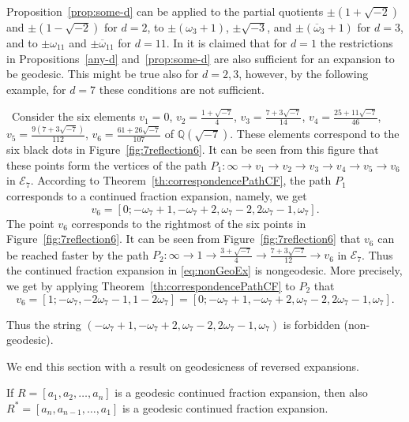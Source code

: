\documentclass[graybox]{svmult}
\begin{document}
Proposition~\ref{prop:some-d} can be applied to the partial quotients $\pm(1 + \sqrt{-2})$ and $\pm(1 - \sqrt{-2})$ for $d=2$,  to $\pm(\omega_{3}+1)$, $\pm \sqrt{-3}$, and $\pm( \overline{\omega}_{3} + 1)$ for 
$d=3$, and to $\pm \omega_{11}$ and $\pm\overline{\omega}_{11}$ for $d =11$.  
In \cite{H-2} it is claimed that for $d=1$ the restrictions in Propositions~\ref{any-d} and~\ref{prop:some-d} are also sufficient for an expansion to be geodesic.  This might be true also for $d= 2, 3$, however, by the following example, for $d=7$ these conditions are not sufficient.
\begin{example}[A subtle nongeodesic path for the case $d=7$]\label{ex:exd7}
\, Consider the six elements $v_1=0$, $v_2=\frac{1 +  \sqrt{-7}}4 $, $v_3=\frac{7 + 3 \sqrt{-7}}{14} $, $v_4=\frac{25 + 11 \sqrt{-7}}{46} $, $v_5=\frac{9(7 + 3 \sqrt{-7})}{112}$, $v_6=\frac{61 + 26 \sqrt{-7}}{107}$ of $\mathbb{Q}(\sqrt{-7})$. These elements correspond to the six black dots in Figure~\ref{fig:7reflection6}. It can be seen from this figure that these points form the vertices of the path $P_1: \infty\to v_1\to v_2\to v_3\to v_4\to v_5\to v_6$ in $\mathcal{E}_7$. According to Theorem~\ref{th:correspondencePathCF}, the path $P_1$ corresponds to a continued fraction expansion, namely, we get
\begin{equation}\label{eq:nonGeoEx}
v_6 = [0;-\omega_7+1,-\omega_7+2, \omega_7-2,2\omega_7-1,\omega_7].
\end{equation}
The point $v_6$ corresponds to the rightmost of the six points in Figure~\ref{fig:7reflection6}. It can be seen from Figure~\ref{fig:7reflection6} that $v_6$ can be reached faster by the path  $P_2:\infty\to 1\to \frac{3 + \sqrt{-7}}4\to \frac{7 + 3 \sqrt{-7}}{12}\to v_6$ in $\mathcal{E}_7$. Thus the continued fraction expansion in \eqref{eq:nonGeoEx} is nongeodesic. More precisely, we get by applying  Theorem~\ref{th:correspondencePathCF} to $P_2$ that
\[
v_6=[1;-\omega_7,-2 \omega_7 - 1,1 - 2 \omega_7]=[0;-\omega_7+1,-\omega_7+2, \omega_7-2,2\omega_7-1,\omega_7].
\]

Thus the string $(-\omega_7+1,-\omega_7+2, \omega_7-2,2\omega_7-1,\omega_7)$ is forbidden (non-geodesic).  
\end{example}

We end this section with a result on geodesicness of reversed expansions.

\begin{proposition}\label{prop:reverse}
If $R = [a_{1},a_{2},\ldots,a_{n}]$ is a  geodesic continued fraction expansion, then also $R^{*} = [a_{n}, a_{n-1},\ldots,a_{1}]$
is a geodesic continued fraction expansion.
\end{proposition}
\end{document}
